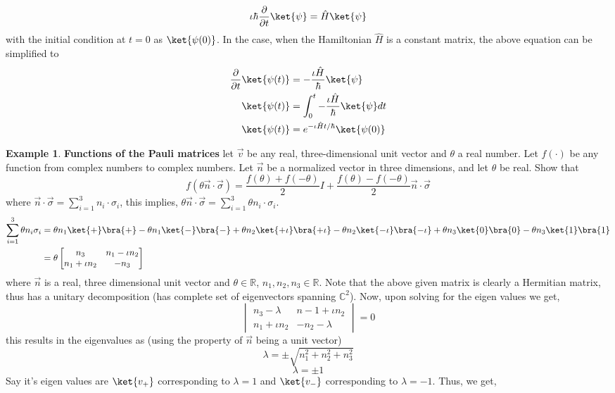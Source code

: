 \documentclass[12pt, oneside]{book}
\theoremstyle{definition}
\theoremstyle{definition}
\newtheorem{example}{Example}[section]
\theoremstyle{remark}
\begin{document}
\[
\iota \hbar\frac{\partial}{\partial t}\ket{\psi}=\hat{H}\ket{\psi}
\]
with the initial condition at $t=0$ as $\ket{\psi(0)}$.
In the case, when the Hamiltonian $\hat{H}$ is a constant matrix, the above equation can be simplified to
\begin{align*}
\frac{\partial}{\partial t}\ket{\psi(t)}&=- \frac{\iota\hat{H}}{\hbar}\ket{\psi}\\
\ket{\psi(t)}&=\int_0^t - \frac{\iota\hat{H}}{\hbar}\ket{\psi} dt\\
\ket{\psi(t)}&=e^{-\iota \hat{H}t/\hbar }\ket{\psi(0)}
\end{align*}
\begin{example}
    \textbf{Functions of the Pauli matrices} let $\vec{v}$ be any real, three-dimensional unit vector and $\theta$ a real number. Let $f(\cdot)$ be any function from complex numbers to complex numbers. Let $\vec{n}$ be a normalized vector in three dimensions, and let $\theta$ be real. Show that
    \[
    f(\theta \vec{n} \cdot \vec{\sigma})=\frac{f(\theta)+f(-\theta)}{2}I+\frac{f(\theta)-f(-\theta)}{2}\vec{n}\cdot \vec{\sigma}
    \]
    where $\vec{n}\cdot\vec{\sigma}=\sum_{i=1}^3 n_i\cdot\sigma_i$, this implies, $\theta\vec{n}\cdot\vec{\sigma}=\sum_{i=1}^3 \theta n_i\cdot\sigma_i$.
    \begin{align*}
    \sum_{i=1}^3 \theta n_i\sigma_i &= \theta n_1 \ket{+}\bra{+}-\theta n_1\ket{-}\bra{-}+\theta n_2\ket{+\iota}\bra{+\iota}-\theta n_2\ket{-\iota}\bra{-\iota} + \theta n_3\ket{0}\bra{0}-\theta n_3\ket{1}\bra{1}\\
    &=\theta \begin{bmatrix} n_3 & n_1-\iota n_2 \\ n_1 + \iota n_2 & -n_3 \end{bmatrix}
    \end{align*}
    where $\vec{n}$ is a real, three dimensional unit vector and $\theta \in \mathbb{R}$, $n_1,n_2,n_3 \in \mathbb{R}$. Note that the above given matrix is clearly a Hermitian matrix, thus has a unitary decomposition (has complete set of eigenvectors spanning $\mathbb{C}^2$). Now, upon solving for the eigen values we get,
    \[
    \begin{vmatrix} n_3 - \lambda & n-1+\iota n_2  \\ n_1+\iota n_2 & -n_2-\lambda \end{vmatrix} = 0
    \]
    this results in the eigenvalues as (using the property of $\vec{n}$ being a unit vector)
    \[
    \lambda=\pm\sqrt{n_1^2+n_2^2+n_3^2}
    \]
    \[
    \lambda=\pm 1
    \]
    Say it's eigen values are $\ket{v_+}$ corresponding to $\lambda=1$ and $\ket{v_-}$ corresponding to $\lambda=-1$. Thus, we get,

\end{example}
\end{document}

